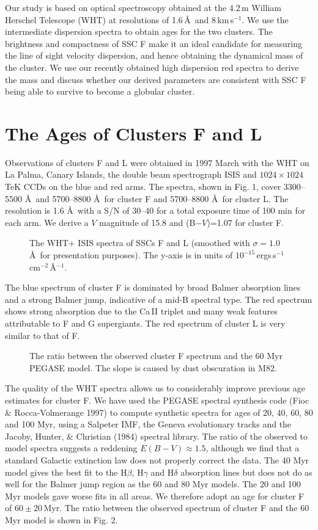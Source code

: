 Our study is based on optical spectroscopy
obtained at the 4.2\,m William Herschel Telescope (WHT) at resolutions
of 1.6\,\AA\ and 8\,km\,s$^{-1}$. We use the intermediate dispersion
spectra to obtain ages for the two clusters.
The brightness and compactness of
SSC F make it an ideal candidate for measuring the line of sight
velocity dispersion, and hence obtaining the dynamical mass of the
cluster. We use our recently obtained high dispersion red spectra to
derive the mass and discuss whether our derived parameters are
consistent with SSC F being able to survive to become a globular
cluster.

\section{The Ages of Clusters F and L}
Observations of clusters F and L were obtained in 1997 March with the
WHT on La Palma, Canary Islands, the double beam spectrograph ISIS and
$1024 \times 1024$ TeK CCDs on the blue and red arms. The spectra,
shown in Fig. 1, cover 3300--5500 \AA\ and 5700--8800 \AA\ for cluster F
and 5700--8800 \AA\ for cluster L. The resolution is
1.6 \AA\ with a S/N of 30--40 for a total exposure time
of 100 min for each arm. We derive a $V$ magnitude of 15.8 and
(B$-V$)=1.07 for cluster F.
\begin{figure}
\caption{The WHT$+$ ISIS spectra of SSCs F and L
(smoothed with $\sigma=1.0$\,\AA\ for presentation purposes).
The y-axis is in units of $10^{-15}$\,ergs\,s$^{-1}$\,cm$^{-2}$\,\AA$^{-1}$.}
\end{figure}

The blue spectrum of cluster F is dominated by broad Balmer absorption
lines and a strong Balmer jump, indicative of a mid-B spectral
type. The red spectrum shows strong absorption due to the Ca\,II
triplet and many weak features attributable to F and G supergiants.
The red spectrum of cluster L is very similar to that of F.
\begin{figure}
\caption{The ratio between the observed cluster F spectrum and the 60 Myr
PEGASE model. The slope is caused by dust obscuration in M82.}
\end{figure}

The quality of the WHT spectra allows us to considerably improve
previous age estimates for cluster F. We have used the PEGASE spectral
synthesis code (Fioc \& Rocca-Volmerange 1997) to compute synthetic
spectra for ages of 20, 40, 60, 80 and 100 Myr, using a Salpeter IMF,
the Geneva evolutionary tracks and the Jacoby, Hunter, \& Christian
(1984) spectral library.
The ratio of the observed to model spectra suggests a reddening
$E(B-V) \approx 1.5$, although we find that a standard Galactic
extinction law does not properly correct the data.  The 40 Myr model
gives the best fit to the H$\beta$, H$\gamma$ and H$\delta$ absorption
lines but does not do as well for the Balmer jump region as the 60 and
80 Myr models. The 20 and 100 Myr models gave worse fits in all
areas. We therefore adopt an age for cluster F of $60\pm20$\,Myr.
The ratio between the observed spectrum of cluster F and the 60 Myr
model is shown in Fig. 2.

